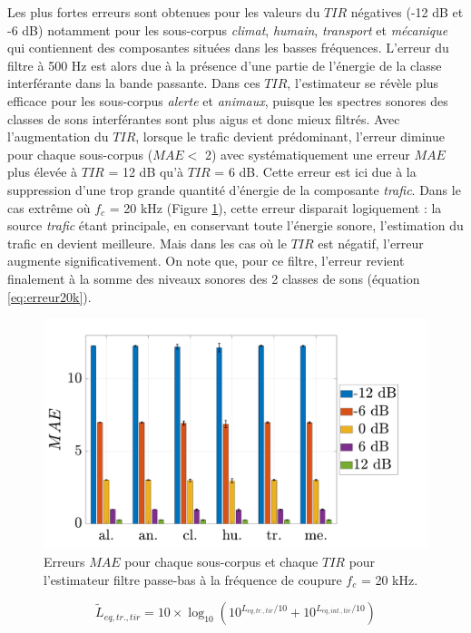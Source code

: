 Les plus fortes erreurs sont obtenues pour les valeurs du $TIR$ négatives (-12 dB et -6 dB) notamment pour les sous-corpus \textit{climat}, \textit{humain}, \textit{transport} et \textit{mécanique} qui contiennent des composantes situées dans les basses fréquences. L'erreur du filtre à 500 Hz est alors due à la présence d'une partie de l'énergie de la classe interférante dans la bande passante. Dans ces $TIR$, l'estimateur se révèle plus efficace pour les sous-corpus \textit{alerte} et \textit{animaux}, puisque les spectres sonores des classes de sons interférantes sont plus aigus et donc mieux filtrés.
Avec l'augmentation du $TIR$, lorsque le trafic devient prédominant, l'erreur diminue pour chaque sous-corpus ($MAE <$ 2) avec systématiquement une erreur $MAE$ plus élevée à $TIR$ = 12 dB qu'à $TIR$ = 6 dB. Cette erreur est ici due à la suppression d'une trop grande quantité d'énergie de la composante \textit{trafic}. Dans le cas extrême où $f_c$ = 20 kHz (Figure \ref{fig:filtre_amb_tir_20k}), cette erreur disparait logiquement : la source \textit{trafic} étant principale, en conservant toute l'énergie sonore, l'estimation du trafic en devient meilleure. Mais dans les cas où le $TIR$ est négatif, l'erreur augmente significativement. On note que, pour ce filtre, l'erreur revient finalement à la somme des niveaux sonores des 2 classes de sons (équation \ref{eq:erreur20k}).

\begin{figure}[h!]
\centering
\includegraphics[width=0.7\linewidth]{./figures/resultats/amb_filtre_20k_bar.pdf}
\caption{Erreurs $MAE$ pour chaque sous-corpus et chaque $TIR$ pour l'estimateur filtre passe-bas à la fréquence de coupure $f_c$ = 20 kHz.}
\label{fig:filtre_amb_tir_20k}
\end{figure}

\begin{equation}\label{eq:erreur20k}
\tilde{L}_{eq,tr.,tir} = 10\times \log_{10}\left(10^{L_{eq,tr.,tir}/10}+10^{L_{eq,int.,tir}/10}\right)
\end{equation}


